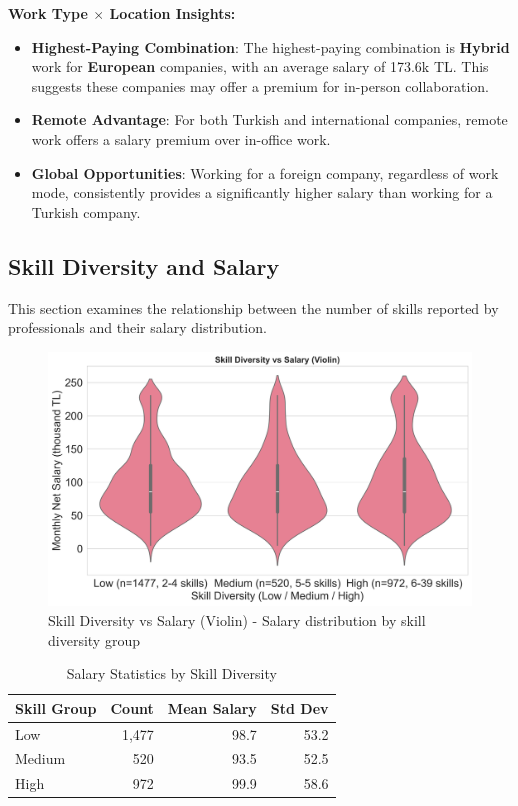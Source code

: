 \documentclass[12pt,a4paper]{article}
\begin{document}
\textbf{Work Type $\times$ Location Insights:}
\begin{itemize}
	\item \textbf{Highest-Paying Combination}: The highest-paying combination is \textbf{Hybrid} work for \textbf{European} companies, with an average salary of 173.6k TL. This suggests these companies may offer a premium for in-person collaboration.
	\item \textbf{Remote Advantage}: For both Turkish and international companies, remote work offers a salary premium over in-office work.
	\item \textbf{Global Opportunities}: Working for a foreign company, regardless of work mode, consistently provides a significantly higher salary than working for a Turkish company.
\end{itemize}

\subsection{Skill Diversity and Salary}
This section examines the relationship between the number of skills reported by professionals and their salary distribution.

\begin{figure}[H]
	\centering
	\includegraphics[width=\textwidth]{figures/violin_skill_diversity.png}
	\caption{Skill Diversity vs Salary (Violin) - Salary distribution by skill diversity group}
\end{figure}

\begin{table}[H]
	\centering
	\small
	\begin{tabular}{lrrr}
		\toprule
		\textbf{Skill Group} & \textbf{Count} & \textbf{Mean Salary} & \textbf{Std Dev} \\
		\midrule
		Low                  & 1,477          & 98.7                 & 53.2             \\
		Medium               & 520            & 93.5                 & 52.5             \\
		High                 & 972            & 99.9                 & 58.6             \\
		\bottomrule
	\end{tabular}
	\caption{Salary Statistics by Skill Diversity}
\end{table}
\end{document}

